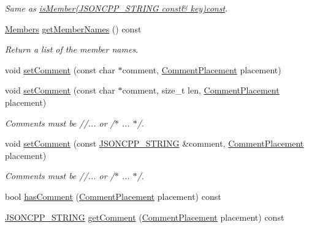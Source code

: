 \begin{DoxyCompactItemize}
\begin{DoxyCompactList}\small\item\em Same as \hyperlink{class_json_1_1_value_a0c2cd838217b23ee6bde8135de1b30d9}{is\+Member(\+J\+S\+O\+N\+C\+P\+P\+\_\+\+S\+T\+R\+I\+N\+G const\& key)const}. \end{DoxyCompactList}\item 
\hyperlink{class_json_1_1_value_a9ae9069983fc38f1928d76f9c79ac64d}{Members} \hyperlink{class_json_1_1_value_a5fa4e5279e83a421f9c128dd78be652b}{get\+Member\+Names} () const
\begin{DoxyCompactList}\small\item\em Return a list of the member names. \end{DoxyCompactList}\item 
void \hyperlink{class_json_1_1_value_a29f3a30f7e5d3af6f38d57999bf5b480}{set\+Comment} (const char $\ast$comment, \hyperlink{namespace_json_a4fc417c23905b2ae9e2c47d197a45351}{Comment\+Placement} placement)
\item 
void \hyperlink{class_json_1_1_value_a2900152a2887b410a9ddabe278b9d492}{set\+Comment} (const char $\ast$comment, size\+\_\+t len, \hyperlink{namespace_json_a4fc417c23905b2ae9e2c47d197a45351}{Comment\+Placement} placement)
\begin{DoxyCompactList}\small\item\em Comments must be //... or /$\ast$ ... $\ast$/. \end{DoxyCompactList}\item 
void \hyperlink{class_json_1_1_value_a2c5d13a5f45eb77e912008778e65b27f}{set\+Comment} (const \hyperlink{config_8h_a1e723f95759de062585bc4a8fd3fa4be}{J\+S\+O\+N\+C\+P\+P\+\_\+\+S\+T\+R\+I\+NG} \&comment, \hyperlink{namespace_json_a4fc417c23905b2ae9e2c47d197a45351}{Comment\+Placement} placement)
\begin{DoxyCompactList}\small\item\em Comments must be //... or /$\ast$ ... $\ast$/. \end{DoxyCompactList}\item 
bool \hyperlink{class_json_1_1_value_a65d8e3ab6a5871cbd019a3e0f0b944a3}{has\+Comment} (\hyperlink{namespace_json_a4fc417c23905b2ae9e2c47d197a45351}{Comment\+Placement} placement) const
\item 
\hyperlink{config_8h_a1e723f95759de062585bc4a8fd3fa4be}{J\+S\+O\+N\+C\+P\+P\+\_\+\+S\+T\+R\+I\+NG} \hyperlink{class_json_1_1_value_a82817229a986f0b254e31d5c83066ffe}{get\+Comment} (\hyperlink{namespace_json_a4fc417c23905b2ae9e2c47d197a45351}{Comment\+Placement} placement) const

\end{DoxyCompactItemize}
